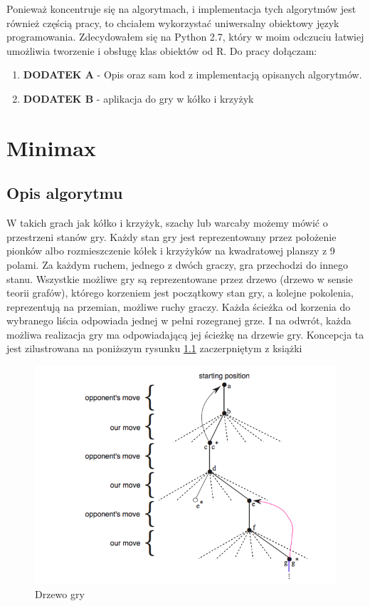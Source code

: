 \documentclass[licencjacka]{pracamgr}
\begin{document}
Ponieważ koncentruje się na algorytmach, i implementacja tych algorytmów jest również częścią pracy, to chciałem wykorzystać uniwersalny obiektowy język programowania. Zdecydowałem się na Python 2.7, który w moim odczuciu łatwiej umożliwia tworzenie i obsługę klas obiektów od R.  Do pracy dołączam:
\begin{enumerate}
	\item \textbf{DODATEK A} - Opis oraz sam kod z implementacją opisanych algorytmów.
	\item \textbf{DODATEK B}  - aplikacja do gry w kółko i krzyżyk
\end{enumerate}


\chapter{Minimax}\label{r:Minimax}


\section{Opis algorytmu}

W takich grach jak kółko i krzyżyk, szachy lub warcaby możemy mówić o przestrzeni stanów gry. Każdy stan  gry jest reprezentowany przez położenie pionków albo rozmieszczenie kółek i krzyżyków na kwadratowej planszy z 9 polami. Za każdym ruchem, jednego z dwóch graczy, gra przechodzi do innego stanu. Wszystkie możliwe gry są reprezentowane przez drzewo (drzewo w sensie teorii grafów), którego korzeniem jest początkowy stan gry, a kolejne pokolenia, reprezentują na przemian, możliwe ruchy graczy.  Każda ścieżka od korzenia do wybranego liścia  odpowiada jednej w pełni rozegranej grze. I na odwrót, każda możliwa realizacja gry ma odpowiadającą jej ścieżkę na drzewie gry.  Koncepcja ta  jest zilustrowana na poniższym rysunku \ref{Rys1} zaczerpniętym z książki \cite{RL} \\
\begin{center}
	\begin{figure}[h!]
	\includegraphics [scale=0.60] {game_tree.png}
	\caption{Drzewo gry}
	\label{Rys1}
	\end{figure}
\end{center}
\end{document}
